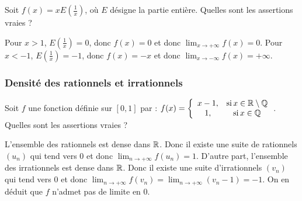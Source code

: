 \begin{question} 
Soit $f(x)= xE(\frac{1}{x})$, où $E$ désigne la partie entière. Quelles sont les assertions vraies ?
\begin{answers}

    
    
    
    
\end{answers}
\begin{explanations}
Pour $x>1$,  $E(\frac{1}{x})=0$, donc $f(x)=0$ et donc  $\lim_{x\to +\infty} f(x)=0$. 
Pour $x<-1$,  $E(\frac{1}{x})=-1$, donc $f(x)=-x$ et donc  $\lim_{x\to -\infty} f(x)=+\infty$. 
\end{explanations}

\end{question} 
 
 
\subsubsection{Densité des rationnels et irrationnels}
  

\begin{question} 
Soit  $f$ une fonction définie sur $[0,1]$ par : $f(x)=\left\{\begin{array}{cc}x-1,& \mbox{si} \, x \in \mathbb{R} \setminus \mathbb{Q}\\ 1,&  \mbox{si} \, x \in \mathbb{Q}  \end{array}\right.$. Quelles sont les assertions vraies ?
\begin{answers}

    
    
    
    

\end{answers}
\begin{explanations}
L'ensemble des rationnels est dense dans $\mathbb{R}$. Donc il existe une suite de rationnels $(u_n)$ qui tend vers $0$ et donc  $\lim_{n\to +\infty} f(u_n)=1$.  D'autre part, l'ensemble des irrationnels est dense dans $\mathbb{R}$.  Donc il existe une suite d'irrationnels $(v_n)$ qui tend vers $0$ et donc  $\lim_{n\to +\infty} f(v_n)=\lim_{n\to +\infty} (v_n-1) = -1 $. On en déduit que  $f$ n'admet pas de limite en $0$.
\end{explanations}

\end{question}


